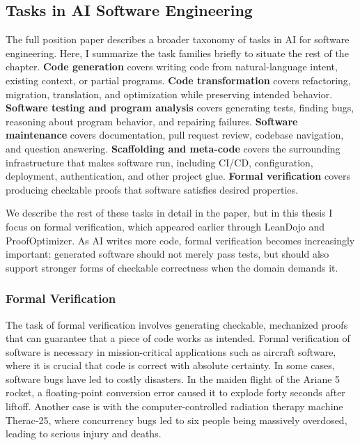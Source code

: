\subsection{Tasks in AI Software Engineering} \label{sec:tasks-milestones}

The full position paper describes a broader taxonomy of tasks in AI for software engineering. Here, I summarize the task families briefly to situate the rest of the chapter. \textbf{Code generation} covers writing code from natural-language intent, existing context, or partial programs. \textbf{Code transformation} covers refactoring, migration, translation, and optimization while preserving intended behavior. \textbf{Software testing and program analysis} covers generating tests, finding bugs, reasoning about program behavior, and repairing failures. \textbf{Software maintenance} covers documentation, pull request review, codebase navigation, and question answering. \textbf{Scaffolding and meta-code} covers the surrounding infrastructure that makes software run, including CI/CD, configuration, deployment, authentication, and other project glue. \textbf{Formal verification} covers producing checkable proofs that software satisfies desired properties.

We describe the rest of these tasks in detail in the paper, but in this thesis I focus on formal verification, which appeared earlier through LeanDojo and ProofOptimizer. As AI writes more code, formal verification becomes increasingly important: generated software should not merely pass tests, but should also support stronger forms of checkable correctness when the domain demands it.

\subsubsection{Formal Verification} \label{subsec:formal-verification}

The task of formal verification involves generating checkable, mechanized proofs that can guarantee that a piece of code works as intended. Formal verification of software is necessary in mission-critical applications such as aircraft software, where it is crucial that code is correct with absolute certainty. In some cases, software bugs have led to costly disasters. In the maiden flight of the Ariane 5 rocket, a floating-point conversion error caused it to explode forty seconds after liftoff. Another case is with the computer-controlled radiation therapy machine Therac-25, where concurrency bugs led to six people being massively overdosed, leading to serious injury and deaths.


